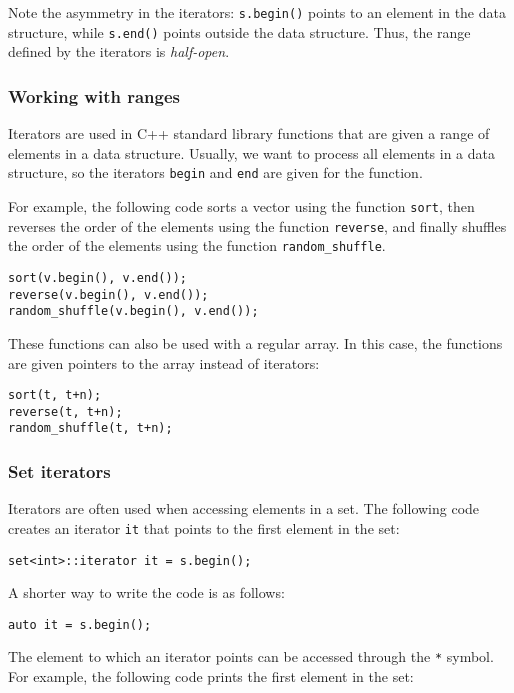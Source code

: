 Note the asymmetry in the iterators:
\texttt{s.begin()} points to an element in the data structure,
while \texttt{s.end()} points outside the data structure.
Thus, the range defined by the iterators is \emph{half-open}.

\subsubsection{Working with ranges}

Iterators are used in C++ standard library functions
that are given a range of elements in a data structure.
Usually, we want to process all elements in a
data structure, so the iterators
\texttt{begin} and \texttt{end} are given for the function.

For example, the following code sorts a vector
using the function \texttt{sort},
then reverses the order of the elements using the function
\texttt{reverse}, and finally shuffles the order of
the elements using the function \texttt{random\_shuffle}.


\begin{lstlisting}
sort(v.begin(), v.end());
reverse(v.begin(), v.end());
random_shuffle(v.begin(), v.end());
\end{lstlisting}

These functions can also be used with a regular array.
In this case, the functions are given pointers to the array
instead of iterators:

\newpage
\begin{lstlisting}
sort(t, t+n);
reverse(t, t+n);
random_shuffle(t, t+n);
\end{lstlisting}

\subsubsection{Set iterators}

Iterators are often used when accessing
elements in a set.
The following code creates an iterator
\texttt{it} that points to the first element in the set:
\begin{lstlisting}
set<int>::iterator it = s.begin();
\end{lstlisting}
A shorter way to write the code is as follows:
\begin{lstlisting}
auto it = s.begin();
\end{lstlisting}
The element to which an iterator points
can be accessed through the \texttt{*} symbol.
For example, the following code prints
the first element in the set:

